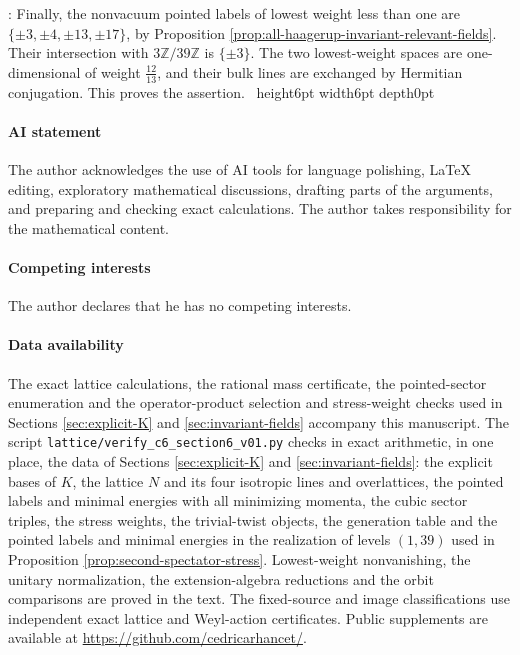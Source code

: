 \documentclass[leqno]{article}
\newcommand{\Z}{\ensuremath{\mathbb{Z}}}
\newcommand{\qed}{\hfill \vrule height6pt  width6pt depth0pt}
\newenvironment{proof}[1][]{\noindent {\it Proof #1} : }{\hbox{~}\qed
\smallskip
}
\numberwithin{equation}{section}
\begin{document}
\begin{proof}
Finally, the nonvacuum pointed labels of lowest weight less than one are $\{\pm3,\pm4,\pm13,\pm17\}$, by Proposition \ref{prop:all-haagerup-invariant-relevant-fields}. Their intersection with $3\Z/39\Z$ is $\{\pm3\}$. The two lowest-weight spaces are one-dimensional of weight $\frac{12}{13}$, and their bulk lines are exchanged by Hermitian conjugation. This proves the assertion.
\end{proof}

\paragraph{AI statement}
The author acknowledges the use of AI tools for language polishing, LaTeX editing, exploratory mathematical discussions, drafting parts of the arguments, and preparing and checking exact calculations. The author takes responsibility for the mathematical content.

\paragraph{Competing interests} The author declares that he has no competing interests.

\paragraph{Data availability} The exact lattice calculations, the rational mass certificate, the pointed-sector enumeration and the operator-product selection and stress-weight checks used in Sections \ref{sec:explicit-K} and \ref{sec:invariant-fields} accompany this manuscript. The script \texttt{lattice/verify\_c6\_section6\_v01.py} checks in exact arithmetic, in one place, the data of Sections \ref{sec:explicit-K} and \ref{sec:invariant-fields}: the explicit bases of $K$, the lattice $N$ and its four isotropic lines and overlattices, the pointed labels and minimal energies with all minimizing momenta, the cubic sector triples, the stress weights, the trivial-twist objects, the generation table and the pointed labels and minimal energies in the realization of levels $(1,39)$ used in Proposition \ref{prop:second-spectator-stress}. Lowest-weight nonvanishing, the unitary normalization, the extension-algebra reductions and the orbit comparisons are proved in the text. The fixed-source and image classifications use independent exact lattice and Weyl-action certificates. Public supplements are available at \url{https://github.com/cedricarhancet/}.
\end{document}
